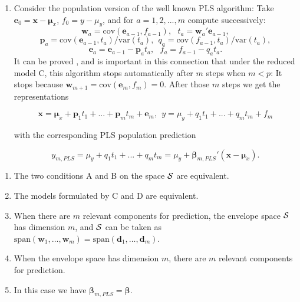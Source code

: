 \documentclass[num-refs]{wiley-article}
\begin{document}
\begin{enumerate}[label=\Alph*.]
\item Consider the  population version of the well known PLS algorithm: Take
  $\bm{e}_{0}=\bm{x}-\bm{\mu}_{x}$, $f_{0}=y-\mu_{y}$, and for $a=1,2,...,m$ compute successively:
  \begin{equation} \label{wt}\bm{w}_{a}=\mathrm{cov}(\bm{e}_{a-1}, f_{a-1}),\ \ \
    t_{a}=\bm{w}_{a}'\bm{e}_{a-1},\end{equation}
  \begin{equation}\label{pq}\bm{p}_{a}=\mathrm{cov}(\bm{e}_{a-1}, t_{a})/\mathrm{var}(t_{a}),\ \
    q_{a}=\mathrm{cov}(f_{a-1},t_{a})/\mathrm{var}(t_{a}),\end{equation}
  \[\bm{e}_{a}=\bm{e}_{a-1}-\bm{p}_{a}t_{a},\ \ \
    f_{a}=f_{a-1}-q_{a}t_{a}.\]
  It can be proved \citep{helland1990partial}, and is important in this connection that under the reduced model C, this algorithm stops automatically after $m$ steps when
  $m<p$: It stops because $\bm{w}_{m+1}=\mathrm{cov}(\bm{e}_{m},f_{m})=0$. After those $m$ steps we get the representations

  \begin{equation}
    \label{latent}
    \bm{x}=\bm{\mu}_{x}+\bm{p}_{1}t_{1}+...+\bm{p}_{m}t_{m}+\bm{e}_{m},\ \ y=\mu_{y}+q_{1}t_{1}+...+q_{m}t_{m}+ f_{m}
  \end{equation}

  with the corresponding PLS population prediction

  \[y_{m,PLS}=\mu_{y}+q_{1}t_{1}+...+q_{m}t_{m}=\mu_{y}+\bm{\beta}_{m,PLS}'(\bm{x}-\bm{\mu}_{x}).\]

\end{enumerate}

\smallskip

\begin{theorem} {\rm\citep{cook2013envelopes,helland1990partial}}
  \begin{enumerate}[label=(\alph*)]
  \item The two conditions A and B on the space $\cal{S}$ are equivalent.
  \item The models formulated by C and D are equivalent.
  \item When there are $m$ relevant components for prediction, the envelope space $\cal{S}$ has dimension $m$, and $\cal{S}$ can be taken as $\mathrm{span}\left(\bm{w}_{1}, \ldots, \bm{w}_{m}\right) = \mathrm{span}\left(\bm{d}_{1}, \ldots, \bm{d}_{m}\right)$.
  \item When the envelope space has dimension $m$, there are $m$ relevant components for prediction.
  \item In this case we have $\bm{\beta}_{m,PLS}=\bm{\beta}$.
  \end{enumerate}
\end{theorem}
\end{document}
